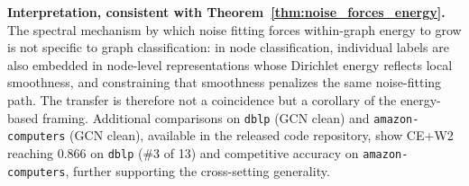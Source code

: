 \textbf{Interpretation, consistent with Theorem~\ref{thm:noise_forces_energy}.} The spectral mechanism by which noise fitting forces within-graph energy to grow is not specific to graph classification: in node classification, individual labels are also embedded in node-level representations whose Dirichlet energy reflects local smoothness, and constraining that smoothness penalizes the same noise-fitting path. The transfer is therefore not a coincidence but a corollary of the energy-based framing. Additional comparisons on \texttt{dblp} (GCN clean) and \texttt{amazon-computers} (GCN clean), available in the released code repository, show CE+W2 reaching $0.866$ on \texttt{dblp} (\#3 of 13) and competitive accuracy on \texttt{amazon-computers}, further supporting the cross-setting generality.
\newpage